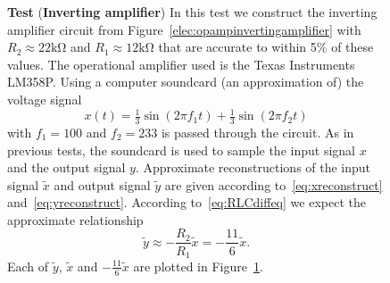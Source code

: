 \documentclass[11pt,a4paper]{book}
\theoremstyle{plain}
\numberwithin{equation}{section}
\newcounter{test}
\newenvironment{test}{
\begin{shaded}\refstepcounter{test}\par\noindent%
\textbf{Test \thetest}
}{
\end{shaded}
}
\newenvironment{randomfloat}{
\begin{figure}
}{
\end{figure}
\addtocounter{figure}{-1}
}
\begin{document}
\begin{randomfloat}
\begin{test}\label{test:opampinvertingamplifiertest1} 
(\textbf{Inverting amplifier})
In this test we construct the inverting amplifier circuit from Figure~\ref{elec:opampinvertingamplifier} with $R_2 \approx 22\si{\kilo\ohm}$ and $R_1\approx 12\si{\kilo\ohm}$ that are accurate to within 5\% of these values.  The operational amplifier used is the Texas Instruments LM358P.  Using a computer soundcard (an approximation of) the voltage signal
\[
x(t) = \tfrac{1}{3}\sin( 2 \pi f_1 t) + \tfrac{1}{3}\sin( 2\pi f_2 t)
\]
with $f_1 = 100$ and $f_2 = 233$ is passed through the circuit.  As in previous tests, the soundcard is used to sample the input signal $x$ and the output signal $y$. Approximate reconstructions of the input signal $\tilde{x}$ and output signal $\tilde{y}$ are given according to~\eqref{eq:xreconstruct} and~\eqref{eq:yreconstruct}.  According to~\eqref{eq:RLCdiffeq} we expect the approximate relationship
\[
\tilde{y} \approx -\frac{R_2}{R_1} \tilde{x} = -\frac{11}{6}\tilde{x}.
\]
Each of $\tilde{y}$, $\tilde{x}$ and $-\tfrac{11}{6}\tilde{x}$ are plotted in Figure~\ref{fig:test:opampinvertingamplifier}.  %

\begin{center}
\captionsetup{type=figure}
\label{fig:test:opampinvertingamplifier}
\end{center}
\end{test}
\end{randomfloat}
\end{document}
